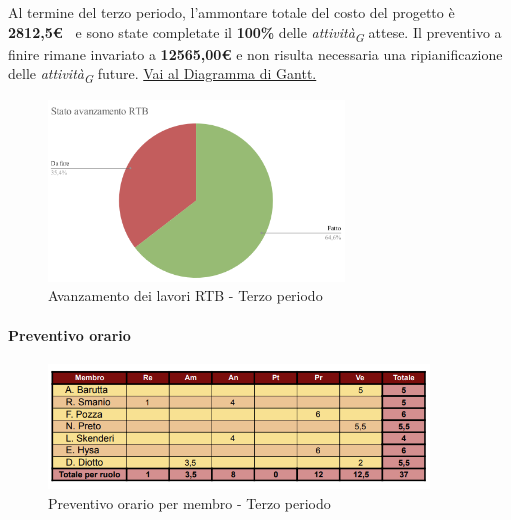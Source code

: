 \vspace{0.5cm}

Al termine del terzo periodo, l'ammontare totale del costo del progetto è \textbf{ 2812,5\euro\ } e sono state completate il \textbf{100\%} delle \textit{attività}\textsubscript{\textit{G}} attese.
Il preventivo a finire rimane invariato a \textbf{12565,00€} e non risulta necessaria una ripianificazione delle \textit{attività}\textsubscript{\textit{G}} future.
\href{https://github.com/orgs/ByteOps-swe/projects/3/views/1?sortedBy%5Bdirection%5D=asc&sortedBy%5BcolumnId%5D=64182560}{Vai al Diagramma di Gantt.}

\pagebreak

\begin{figure}[H]
    \centering
    \begin{minipage}[b]{0.70\textwidth}
        \centering
        \includegraphics[width=0.7\textwidth]{../Images/torta3.png}
        \caption{Avanzamento dei lavori RTB - Terzo periodo}
        \label{fig:Avanzamento_RTB_3}
    \end{minipage}
\end{figure}

\paragraph{Preventivo orario} 

\begin{figure}[H]
    \centering
    \includegraphics[width=0.9\textwidth]{../Images/tabPrev3.png}
    \caption{Preventivo orario per membro - Terzo periodo}
    \label{fig:Preventivo_orario_3}
\end{figure}

